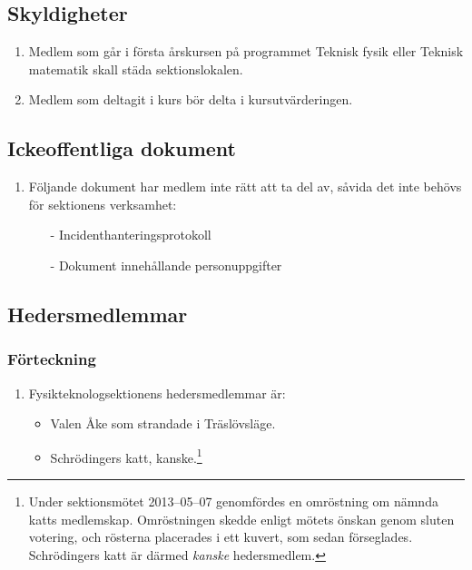 \documentclass[11pt,a4paper]{article}
\begin{document}
\subsection{Skyldigheter}
\begin{enumerate}[\thesubsection .1]
\item Medlem som går i första årskursen på programmet Teknisk fysik
     eller Teknisk matematik skall städa sektionslokalen.
 

   \item Medlem som deltagit i kurs bör delta i kursutvärderingen.
\end{enumerate}

\subsection{Ickeoffentliga dokument}

\begin{enumerate}[\thesubsection .1]

  \item Följande dokument har medlem inte rätt att ta del av, såvida det inte behövs för sektionens verksamhet:
  	\begin{itemize}
  		\item[-] Incidenthanteringsprotokoll
	 	\item[-] Dokument innehållande personuppgifter
  	\end{itemize}

\end{enumerate}

\subsection{Hedersmedlemmar}

\subsubsection{Förteckning}

\begin{enumerate}[\thesubsection .1]

  \item Fysikteknologsektionens hedersmedlemmar är:
    \begin{itemize}
      \item Valen Åke som strandade i Träslövsläge.
      \item Schrödingers katt, kanske.\footnote{Under sektionsmötet 2013--05--07 genomfördes en omröstning om nämnda katts medlemskap. Omröstningen skedde enligt mötets önskan genom sluten votering, och rösterna placerades i ett kuvert, som sedan förseglades. Schrödingers katt är därmed \textit{kanske} hedersmedlem.}
    \end{itemize}

\end{enumerate}
\end{document}
